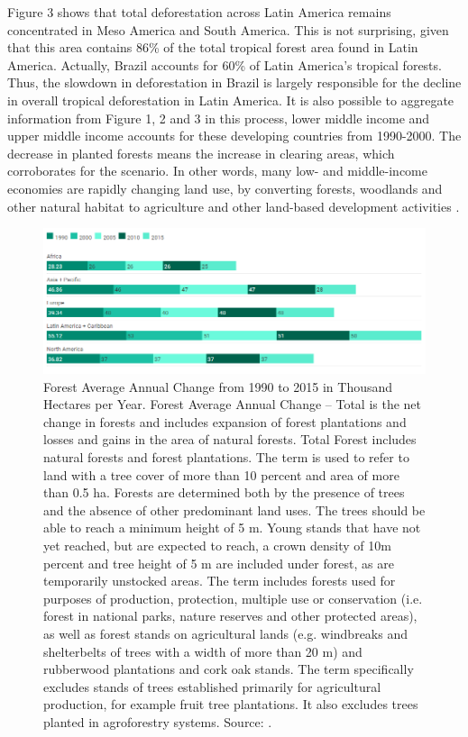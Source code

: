 Figure 3 shows that total deforestation across Latin America remains concentrated
in Meso America and South America. This is not surprising, given that this area contains 86\% of the total tropical forest area found in Latin America. Actually, Brazil accounts for 60\% of Latin America’s tropical forests. Thus, the slowdown in deforestation in Brazil is largely responsible for the decline in overall tropical deforestation in Latin America. It is also possible to aggregate information from Figure 1, 2 and 3 in this process, lower middle income and upper middle income accounts for these developing countries from 1990-2000. The decrease in
planted forests means the increase in clearing areas, which corroborates for the scenario.
In other words, many low- and middle-income economies are rapidly changing land use, by converting forests, woodlands and other natural habitat to agriculture and other land-based development activities \citep{BARBIER2}.

\begin{figure}[H]
\centering
\includegraphics[width=1\linewidth]{Introduction/landcoveredbyforest.png}
\caption[Forest Average Annual Change from 1990 to 2015 in Thousand Hectares per Year.]{Forest Average Annual Change from 1990 to 2015 in Thousand Hectares per Year. Forest Average Annual Change – Total is the net change in forests and includes expansion of forest plantations and losses and gains in the area of natural forests. Total Forest includes natural forests and forest plantations. The term is used to refer to land with a tree cover of more than 10 percent and area of more than 0.5 ha. Forests are determined both by the presence of trees and the absence of other predominant land uses. The trees should be able to reach a minimum height of 5 m. Young stands that have not yet reached, but are expected to reach, a crown density of 10m percent and tree height of 5 m are included under forest, as are temporarily unstocked areas. The term includes forests used for purposes of production, protection, multiple use or conservation (i.e. forest in national parks, nature reserves and other protected areas), as well as forest stands on agricultural lands (e.g. windbreaks and shelterbelts of trees with a width of more than 20 m) and rubberwood plantations and cork oak stands. The term specifically excludes stands of trees established primarily for agricultural production, for example fruit tree plantations. It also excludes trees planted in agroforestry systems. Source: \citep{unep_2018}.}
\label{intro-fig:3}
\end{figure}

